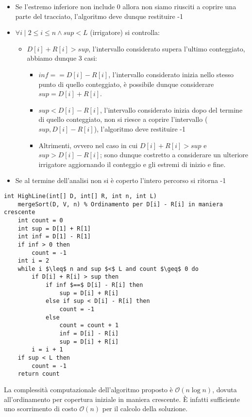 \documentclass[../cheatSheetAlgoritmi.tex]{subfiles}
\begin{document}
\begin{itemize}
    \item Se l'estremo inferiore non include 0 allora non siamo riusciti a coprire una parte del tracciato, l'algoritmo deve dunque restituire -1
    \item $\forall i \mid 2 \leq i \leq n \land sup < L$ (irrigatore) si controlla:
    \begin{itemize}
        \item $D[i] + R[i] > sup$, l'intervallo considerato supera l'ultimo conteggiato, abbiamo dunque 3 casi:
        \begin{itemize}
            \item $inf == D[i] - R[i]$, l'intervallo considerato inizia nello stesso punto di quello conteggiato, è possibile dunque considerare $sup = D[i] + R[i]$.
            \item $sup < D[i] - R[i]$, l'intervallo considerato inizia dopo del termine di quello conteggiato, non si riesce a coprire l'intervallo ($sup, D[i] - R[i]$), l'algoritmo deve restituire -1
            \item Altrimenti, ovvero nel caso in cui $D[i] + R[i] > sup$ e $sup > D[i] - R[i]$; sono dunque costretto a considerare un ulteriore irrigatore aggiornando il conteggio e gli estremi di inizio e fine.
        \end{itemize}
    \end{itemize}
    \item Se al termine dell'analisi non si è coperto l'intero percorso si ritorna -1
\end{itemize}
\begin{lstlisting}[caption=HighLine]
int HighLine(int[] D, int[] R, int n, int L)
    mergeSort(D, V, n) % Ordinamento per D[i] - R[i] in maniera crescente
    int count = 0
    int sup = D[1] + R[1]
    int inf = D[1] - R[1]
    if inf > 0 then
        count = -1
    int i = 2 
    while i $\leq$ n and sup $<$ L and count $\geq$ 0 do 
        if D[i] + R[i] > sup then
            if inf $==$ D[i] - R[i] then
                sup = D[i] + R[i]
            else if sup < D[i] - R[i] then
                count = -1
            else 
                count = count + 1
                inf = D[i] - R[i]
                sup = D[i] + R[i]
        i = i + 1
    if sup < L then
        count = -1
    return count
\end{lstlisting}
La complessità computazionale dell'algoritmo proposto è $\mathcal{O}(n\log n)$, dovuta all'ordinamento per copertura iniziale in maniera crescente. È infatti sufficiente uno scorrimento di costo $\mathcal{O}(n)$ per il calcolo della soluzione.
\end{document}
